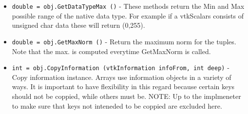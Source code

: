 \begin{itemize}
\item  \verb|double = obj.GetDataTypeMax ()| -  These methods return the Min and Max possible range of the native
 data type. For example if a vtkScalars consists of unsigned char
 data these will return (0,255). 

\item  \verb|double = obj.GetMaxNorm ()| -  Return the maximum norm for the tuples.
 Note that the max. is computed everytime GetMaxNorm is called.

\item  \verb|int = obj.CopyInformation (vtkInformation infoFrom, int deep)| -  Copy information instance. Arrays use information objects
 in a variety of ways. It is important to have flexibility in
 this regard because certain keys should not be coppied, while
 others must be. NOTE: Up to the implmeneter to make sure that
 keys not inteneded to be coppied are excluded here.

\end{itemize}
